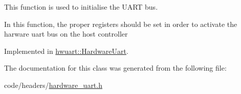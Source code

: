 This function is used to initialise the U\+A\+RT bus. 

In this function, the proper registers should be set in order to activate the harware uart bus on the host controller 

Implemented in \hyperlink{classhwuart_1_1HardwareUart_ad157ae997485682f74c5607dc7d2dc70}{hwuart\+::\+Hardware\+Uart}.



The documentation for this class was generated from the following file\+:\begin{DoxyCompactItemize}
\item 
code/headers/\hyperlink{hardware__uart_8h}{hardware\+\_\+uart.\+h}\end{DoxyCompactItemize}
